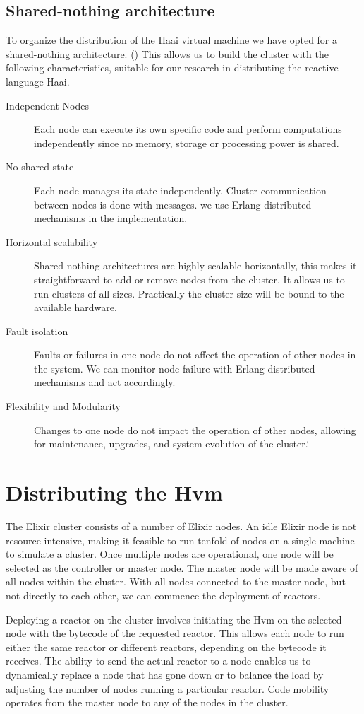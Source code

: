 \documentclass[a4paper]{book}
\begin{document}
\subsection{Shared-nothing architecture}
To organize the distribution of the Haai virtual machine we have opted for a shared-nothing architecture. (\cite{DBLP:journals/debu/Stonebraker86}) This allows us to build the cluster with the following characteristics, suitable for our research in distributing the reactive language Haai.
\begin{description}
	\item[Independent Nodes] Each node can execute its own specific code and perform computations independently since no memory, storage or processing power is shared.
	\item[No shared state] Each node manages its state independently. Cluster communication between nodes is done with messages. we use Erlang distributed mechanisms in the implementation.
	\item[Horizontal scalability] Shared-nothing architectures are highly scalable horizontally, this makes it straightforward to add or remove nodes from the cluster. It allows us to run clusters of all sizes. Practically the cluster size will be bound to the available hardware.
	\item[Fault isolation] Faults or failures in one node do not affect the operation of other nodes in the system. We can monitor node failure with Erlang distributed mechanisms and act accordingly. 
	\item[Flexibility and Modularity] Changes to one node do not impact the operation of other nodes, allowing for maintenance, upgrades, and system evolution of the cluster.` 
\end{description}  
\section{Distributing the Hvm}
The Elixir cluster consists of a number of Elixir nodes. An idle Elixir node is not resource-intensive, making it feasible to run tenfold of nodes on a single machine to simulate a cluster. Once multiple nodes are operational, one node will be selected as the controller or master node. The master node will be made aware of all nodes within the cluster. With all nodes connected to the master node, but not directly to each other, we can commence the deployment of reactors.

Deploying a reactor on the cluster involves initiating the Hvm on the selected node with the bytecode of the requested reactor. This allows each node to run either the same reactor or different reactors, depending on the bytecode it receives. The ability to send the actual reactor to a node enables us to dynamically replace a node that has gone down or to balance the load by adjusting the number of nodes running a particular reactor. Code mobility operates from the master node to any of the nodes in the cluster.
\end{document}
